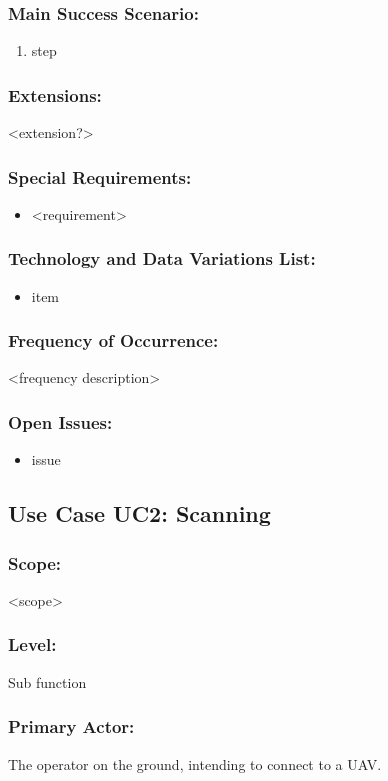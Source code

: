 \documentclass[ProductRequirements.tex]{subfiles}
\begin{document}
	\subsubsection{Main Success Scenario:}
	\begin{enumerate}\itemsep1pt
		\item step
	\end{enumerate}
	\subsubsection{Extensions:}
	<extension?>
	\subsubsection{Special Requirements:}
	\begin{itemize}\itemsep1pt
		\item <requirement>
	\end{itemize}
	\subsubsection{Technology and Data Variations List:}
	\begin{itemize}\itemsep1pt
		\item item
	\end{itemize}
	\subsubsection{Frequency of Occurrence:}
	<frequency description>
	\subsubsection{Open Issues:}
	\begin{itemize}\itemsep1pt
		\item issue
	\end{itemize}
	
	
	\subsection{Use Case UC2: Scanning}
	\subsubsection{Scope:}
	<scope>
	\subsubsection{Level:}
	Sub function
	\subsubsection{Primary Actor:}
	The operator on the ground, intending to connect to a UAV.
\end{document}
